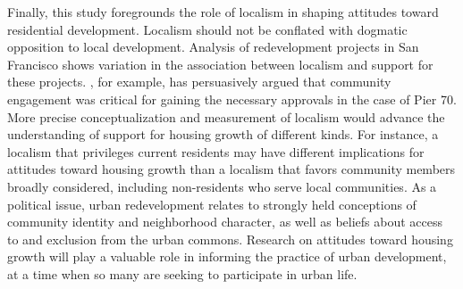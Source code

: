 \documentclass[article,12pt]{memoir}
\begin{document}
Finally, this study foregrounds the role of localism in shaping attitudes toward residential development. Localism should not be conflated with dogmatic opposition to local development. Analysis of redevelopment projects in San Francisco shows variation in the association between localism and support for these projects. \citet{kuwada_shaping_2015}, for example, has persuasively argued that community engagement was critical for gaining the necessary approvals in the case of Pier 70. More precise conceptualization and measurement of localism would advance the understanding of support for housing growth of different kinds. For instance, a localism that privileges current residents may have different implications for attitudes toward housing growth than a localism that favors community members broadly considered, including non-residents who serve local communities.  As a political issue, urban redevelopment relates to strongly held conceptions of community identity and neighborhood character, as well as beliefs about access to and exclusion from the urban commons.  Research on attitudes toward housing growth will play a valuable role in informing the practice of urban development, at a time when so many are seeking to participate in urban life.
\end{document}
